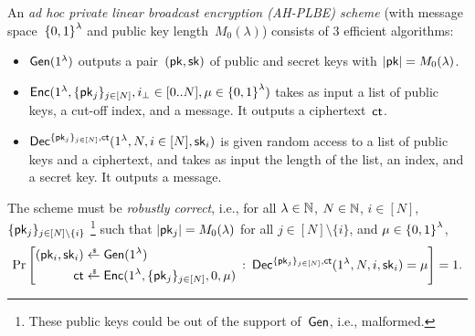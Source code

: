 \begin{definition}[AH-PLBE]\label{def:ahplbe}
An \emph{ad hoc private linear broadcast encryption (AH-PLBE) scheme}
(with message space~${\{0,1\}}^\lambda$ and public key length~$M_0(\lambda)$)
consists of 3 efficient algorithms:
\begin{itemize}
\item $\Gen(1^\lambda)$ outputs a pair~$(\pk,\sk)$ of public and secret keys
with ${|\pk|=M_0(\lambda)}$.
\item $\Enc(1^\lambda,\{\pk_j\}_{j\in[N]},{i_\bot\in[0..N]},{\mu\in\bit^\lambda})$
takes as input
a list of public keys,
a cut-off index,
and a message.
It outputs a ciphertext~$\ct$.
\item $\Dec^{\{\pk_j\}_{j\in[N]},\ct}(1^\lambda,N,{i\in[N]},\sk_i)$
is given random access to a list of public keys and a ciphertext, and
takes as input
the length of the list,
an index, and
a secret key.
It outputs a message.
\end{itemize}
The scheme must be \emph{robustly correct}, i.e., for all
${\lambda\in{\mathbb{N}}}$,
${N\in{\mathbb{N}}}$,
${i\in[N]}$,\WideNarrow{}{\linebreak[4]}
$\{\pk_j\}_{j\in[N]\setminus\{i\}}$%
\footnote{These public keys could be out of the support of~$\Gen$,
i.e., malformed.}
such that ${|\pk_j|=M_0(\lambda)}$ for all ${j\in[N]\setminus\{i\}}$, and
${\mu\in{\{0,1\}}^\lambda}$,
\begin{align*}
\Pr\left[
\begin{aligned}
(\pk_i,\sk_i)&{}\draws\Gen(1^\lambda)\\
\ct&{}\draws\Enc(1^\lambda,\{\pk_j\}_{j\in[N]},0,\mu)
\end{aligned}
\WideNarrow{\::\:}{\:{:}\:}
\Dec^{\{\pk_j\}_{j\in[N]},\ct}(1^\lambda,N,i,\sk_i)=\mu
\right]=1.
\end{align*}
\end{definition}
